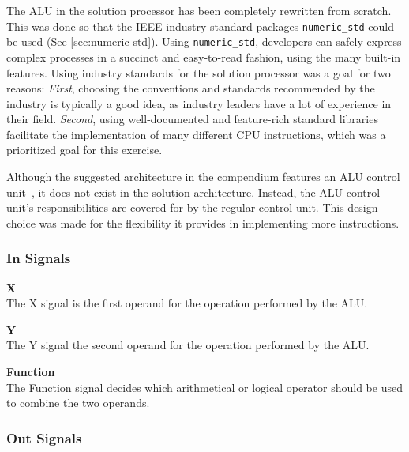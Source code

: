 The ALU in the solution processor has been completely rewritten from scratch.
This was done so that the IEEE industry standard packages \texttt{numeric\_std} could be used (See \vref{sec:numeric-std}).
Using \texttt{numeric\_std}, developers can safely express complex processes in a succinct and easy-to-read fashion, using the many built-in features.
Using industry standards for the solution processor was a goal for two reasons:
\textit{First}, choosing the conventions and standards recommended by the industry is typically a good idea, as industry leaders have a lot of experience in their field.
\textit{Second}, using well-documented and feature-rich standard libraries facilitate the implementation of many different CPU instructions, which was a prioritized goal for this exercise.

Although the suggested architecture in the compendium features an ALU control unit~\cite[p.115]{compendium}, it does not exist in the solution architecture.
Instead, the ALU control unit's responsibilities are covered for by the regular control unit.
This design choice was made for the flexibility it provides in implementing more instructions.

\subsubsection{In Signals}

\begin{description}
\item{\textbf{X}} \\
The X signal is the first operand for the operation performed by the ALU.

\item{\textbf{Y}} \\
The Y signal the second operand for the operation performed by the ALU.

\item{\textbf{Function}} \\
The Function signal decides which arithmetical or logical operator should be used to combine the two operands.
\end{description}

\subsubsection{Out Signals}

